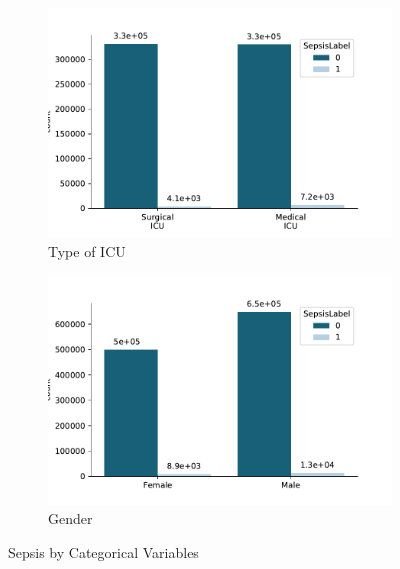 \documentclass[10pt,letterpaper]{article}
\begin{document}
\begin{figure}[hbtp!]
\centering
\begin{subfigure}[b]{0.45\textwidth}
    \centering
    \includegraphics[scale = 0.6]{label_ICU.pdf}
    \caption{Type of ICU}
    \label{fig:label_ICU}
\end{subfigure}
\begin{subfigure}[b]{0.45\textwidth}
    \centering
    \includegraphics[scale = 0.6]{label_per_sex.pdf}
    \caption{Gender}
    \label{fig:label_per_sex}
\end{subfigure}
\caption{Sepsis by Categorical Variables}
\end{figure}

\par 
\end{document}
